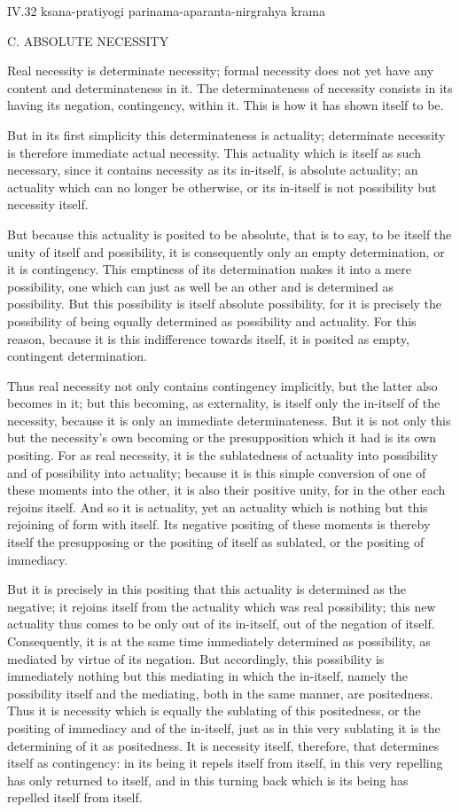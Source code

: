 IV.32
ksana-pratiyogi parinama-aparanta-nirgrahya krama

C. ABSOLUTE NECESSITY

Real necessity is determinate necessity;
formal necessity does not yet have
any content and determinateness in it.
The determinateness of necessity consists in
its having its negation, contingency, within it.
This is how it has shown itself to be.

But in its first simplicity this determinateness is actuality;
determinate necessity is therefore immediate actual necessity.
This actuality which is itself as such necessary,
since it contains necessity as its in-itself,
is absolute actuality;
an actuality which can no longer be otherwise,
or its in-itself is not possibility but necessity itself.

But because this actuality is posited to be absolute,
that is to say, to be itself
the unity of itself and possibility,
it is consequently only an empty determination,
or it is contingency.
This emptiness of its determination makes it
into a mere possibility,
one which can just as well be an other
and is determined as possibility.
But this possibility is itself absolute possibility,
for it is precisely the possibility of being
equally determined as possibility and actuality.
For this reason, because it is this indifference towards itself,
it is posited as empty, contingent determination.

Thus real necessity not only contains contingency implicitly,
but the latter also becomes in it;
but this becoming, as externality,
is itself only the in-itself of the necessity,
because it is only an immediate determinateness.
But it is not only this but the necessity's own becoming
or the presupposition which it had is its own positing.
For as real necessity, it is the sublatedness
of actuality into possibility
and of possibility into actuality;
because it is this simple conversion of
one of these moments into the other,
it is also their positive unity,
for in the other each rejoins itself.
And so it is actuality, yet an actuality
which is nothing but this rejoining of form with itself.
Its negative positing of these moments is
thereby itself the presupposing
or the positing of itself as sublated,
or the positing of immediacy.

But it is precisely in this positing that
this actuality is determined as the negative;
it rejoins itself from the actuality which was real possibility;
this new actuality thus comes to be only out of its in-itself,
out of the negation of itself.
Consequently, it is at the same time
immediately determined as possibility,
as mediated by virtue of its negation.
But accordingly, this possibility is
immediately nothing but this mediating
in which the in-itself,
namely the possibility itself and the mediating,
both in the same manner, are positedness.
Thus it is necessity which is
equally the sublating of this positedness,
or the positing of immediacy and of the in-itself,
just as in this very sublating
it is the determining of it as positedness.
It is necessity itself, therefore,
that determines itself as contingency:
in its being it repels itself from itself,
in this very repelling has only returned to itself,
and in this turning back which is its being
has repelled itself from itself.

